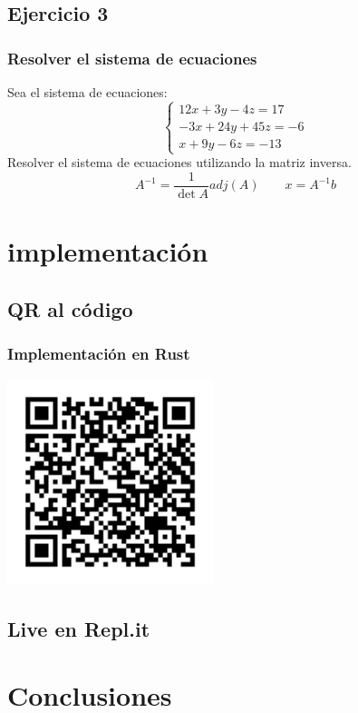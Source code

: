 \documentclass{beamer}
\begin{document}
    \subsection{Ejercicio 3}
        \begin{frame}
            \frametitle{Resolver el sistema de ecuaciones}
            Sea el sistema de ecuaciones:
            $$
            \begin{cases}
                12x + 3y - 4z = 17 \\
                -3x + 24y + 45z = -6 \\
                x + 9y - 6z = -13
            \end{cases}
            $$
            Resolver el sistema de ecuaciones utilizando la matriz inversa.
            $$
                A^{-1} = \frac{1}{\det{A}}adj(A)\qquad x = A^{-1}b
            $$
        \end{frame}

    \section{implementación}
    \subsection{QR al código}
    \begin{frame}
        \frametitle{Implementación en Rust}
        \begin{center}
            \includegraphics[width=170pt]{images/QR_rust_implementation.png}
        \end{center}
    \end{frame}
    \subsection{Live en Repl.it}
    \section{Conclusiones}
\end{document}
